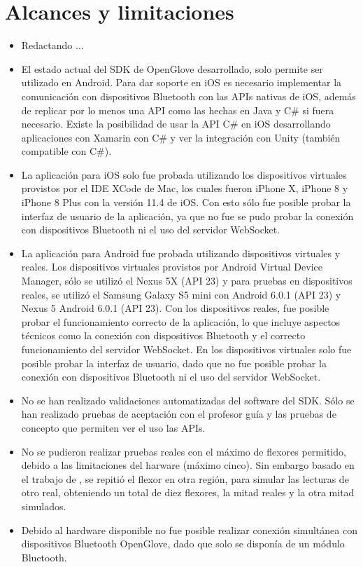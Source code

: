 \section{Alcances y limitaciones}

\begin{itemize}
	\item Redactando ...
	
	\item El estado actual del SDK de OpenGlove desarrollado, solo permite ser utilizado en Android. Para dar soporte en iOS es necesario implementar la comunicación con dispositivos Bluetooth con las APIs nativas de iOS, además de replicar por lo menos una API como las hechas en Java y C\# si fuera necesario. Existe la posibilidad de usar la API C\# en iOS desarrollando aplicaciones con Xamarin con C\# y ver la integración con Unity (también compatible con C\#).
	
	\item La aplicación para iOS solo fue probada utilizando los dispositivos virtuales provistos por el IDE XCode de Mac, los cuales fueron iPhone X, iPhone 8 y iPhone 8 Plus  con la versión 11.4 de iOS. Con esto sólo fue posible probar la interfaz de usuario de la aplicación, ya que no fue se pudo probar la conexión con dispositivos Bluetooth ni el uso del servidor WebSocket.
	
	\item La aplicación para Android fue probada utilizando dispositivos virtuales y reales. Los dispositivos virtuales provistos por Android Virtual Device Manager, sólo se utilizó el Nexus 5X (API 23) y para pruebas en dispositivos reales, se utilizó el Samsung Galaxy S5 mini con Android 6.0.1 (API 23) y Nexus 5 Android 6.0.1 (API 23). Con los dispositivos reales, fue posible probar el funcionamiento correcto de la aplicación, lo que incluye aspectos técnicos como la conexión con dispositivos Bluetooth y el correcto funcionamiento del servidor WebSocket. En los dispositivos virtuales solo fue posible probar la interfaz de usuario, dado que no fue posible probar la conexión con dispositivos Bluetooth ni el uso del servidor WebSocket.
	
	\item No se han realizado validaciones automatizadas del software del SDK. Sólo se han realizado pruebas de aceptación con el profesor guía y las pruebas de concepto que permiten ver el uso las APIs.
	
	\item No se pudieron realizar pruebas reales con el máximo de flexores permitido, debido a las limitaciones del harware (máximo cinco). Sin embargo basado en el trabajo de \cite{tesis-cerda-rodrigo}, se repitió el flexor en otra región, para simular las lecturas de otro real, obteniendo un total de diez flexores, la mitad reales y la otra mitad simulados.
	
	\item Debido al hardware disponible no fue posible realizar conexión simultánea con dispositivos Bluetooth OpenGlove, dado que solo se disponía de un módulo Bluetooth.
	
	
\end{itemize}